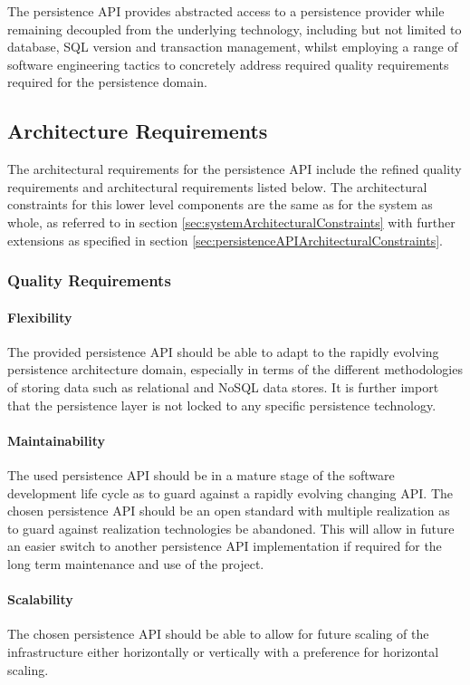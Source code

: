 The persistence API provides abstracted access to a persistence provider while
remaining decoupled from the underlying technology, including but not limited to
database, SQL version and transaction management, whilst employing a range of
software engineering tactics to concretely address required quality
requirements required for the persistence domain.

\subsection{Architecture Requirements}
The architectural requirements for the persistence API include the refined
quality requirements and architectural requirements listed below. The
architectural constraints for this lower level components are the same as for
the system as whole, as referred to in
section \ref{sec:systemArchitecturalConstraints} with further extensions as
specified in section \ref{sec:persistenceAPIArchitecturalConstraints}.

\subsubsection{Quality Requirements}
\paragraph*{Flexibility}
The provided persistence API should be able to adapt to the rapidly evolving
persistence architecture domain, especially in terms of the different
methodologies of storing data such as relational and NoSQL data stores. It is
further import that the persistence layer is not locked to any specific
persistence technology.

\paragraph*{Maintainability}
\label{sec:persistenceAPIMaintainability}
The used persistence API should be in a mature stage of the software development
life cycle as to guard against a rapidly evolving changing API. The chosen
persistence API should be an open standard with multiple realization as to guard
against realization technologies be abandoned. This will allow in future an easier
switch to another persistence API implementation if required for the long term
maintenance and use of the project.

\paragraph*{Scalability}
The chosen persistence API should be able to allow for future scaling of the
infrastructure either horizontally or vertically with a preference for
horizontal scaling.

